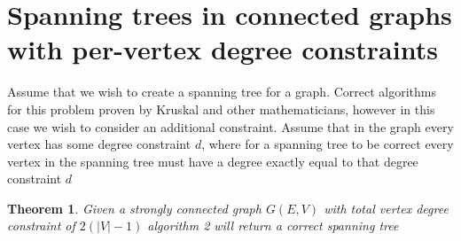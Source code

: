 \documentclass{article}
\newtheorem{theorem}{Theorem}
\begin{document}
\section{Spanning trees in connected graphs with per-vertex degree constraints}
Assume that we wish to create a spanning tree for a graph. Correct algorithms for this problem proven by Kruskal and other
mathematicians, however in this case we wish to consider an additional constraint. Assume that in the graph every vertex has some degree constraint $d$,
where for a spanning tree to be correct every vertex in the spanning tree must have a degree exactly equal to that degree constraint $d$
\\
\begin{theorem}
Given a strongly connected graph $G(E,V)$ with total vertex degree constraint of $2(|V|-1)$ algorithm 2 will return a correct spanning tree
\end{theorem}
\end{document}
